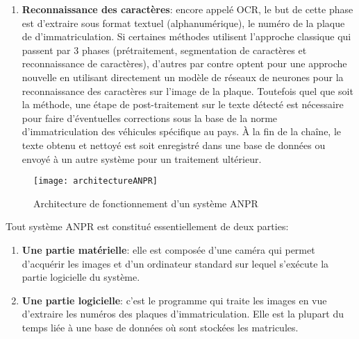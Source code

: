 \begin{enumerate}
    \item \textbf{Reconnaissance des caractères}: encore appelé OCR, le but de cette phase est d’extraire sous format textuel (alphanumérique), le numéro de la plaque de d’immatriculation. Si certaines méthodes \cite{krimMaster, 10.1155/2018/6737314} utilisent l'approche classique qui passent par 3 phases (prétraitement, segmentation de caractères et reconnaissance de caractères), d’autres \cite{Alahyane2021OpenDF, doi:10.1177/0361198120954202} par contre optent pour une approche nouvelle en utilisant directement un modèle de réseaux de neurones pour la reconnaissance des caractères sur l'image de la plaque. Toutefois quel que soit la méthode, une étape de post-traitement sur le texte détecté est nécessaire pour faire d'éventuelles corrections sous la base de la norme d’immatriculation des véhicules spécifique au pays. À la fin de la chaîne, le texte obtenu et nettoyé est soit enregistré dans une base de données ou envoyé à un autre système pour un traitement ultérieur.

\end{enumerate}

\begin{figure}[H]
    \centering
    \texttt{[image: architectureANPR]}
    \caption{Architecture de fonctionnement d'un système ANPR}
\end{figure}
Tout système ANPR est constitué essentiellement de deux parties:
    \begin{enumerate}
        \item \textbf{Une partie matérielle}: elle est composée d’une caméra qui permet d’acquérir les images et d’un ordinateur standard sur lequel s'exécute la partie logicielle du système.
        \item \textbf{Une partie logicielle}: c’est le programme qui traite les images en vue d’extraire les numéros des plaques d’immatriculation. Elle est la plupart du temps liée à une base de données où sont stockées les matricules.
    \end{enumerate}